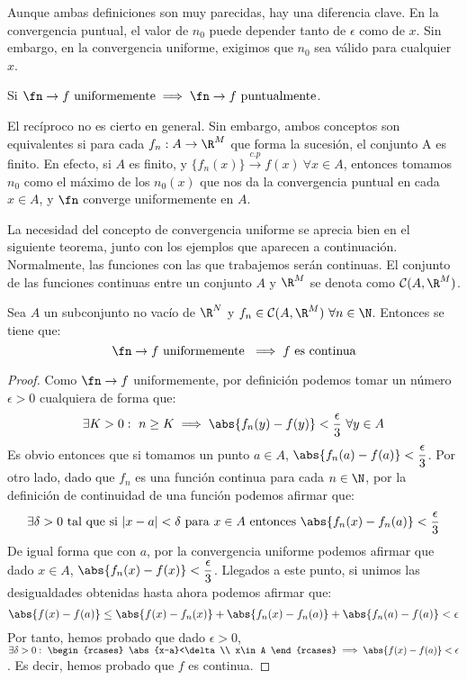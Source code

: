 \begin{nota}
  Aunque ambas definiciones son muy parecidas, hay una diferencia clave. En la convergencia puntual, el valor de $n_0$ puede depender tanto de $\epsilon$ como de $x$. Sin embargo, en la convergencia uniforme, exigimos que $n_0$ sea válido para cualquier $x$.
\end{nota}

\begin{nprop} \label{unif_puntual}
  Si $\fn\to f \text{ uniformemente} \implies \fn \to f \text{ puntualmente}$.
\end{nprop}

  \begin{nota}
    El recíproco no es cierto en general. Sin embargo, ambos conceptos son equivalentes si para cada $f_n : A \rightarrow \R^M$ que forma la sucesión, el conjunto A es finito. En efecto, si $A$ es finito, y $\{f_n(x)\} \xrightarrow {c.p} f(x) \ \forall x \in A$, entonces tomamos $n_0$ como el máximo de los $n_0(x)$ que nos da la convergencia puntual en cada $x \in A$, y $\fn$ converge uniformemente en $A$.
  \end{nota}

  La necesidad del concepto de convergencia uniforme se aprecia bien
  en el siguiente teorema, junto con los ejemplos que aparecen a
  continuación. Normalmente, las funciones con las que trabajemos
  serán continuas. El conjunto de las funciones continuas entre un
  conjunto $A$ y $\R^M$ se denota como $\mathcal{C}(A,\R^M)$.

\begin{nth}
  \label{2}
  Sea $A$ un subconjunto no vacío de $\R^N$ y $f_n \in \mathcal{C}(A,\R^M)\ \forall n\in \N$. Entonces se tiene que:
  \[
    \fn \to f \text{ uniformemente } \implies f \text{ es continua}
  \]
\end{nth}

\begin{proof}
  Como $\fn \to f$ uniformemente, por definición podemos tomar un número $\epsilon > 0$ cualquiera de forma que:
  \[ \exists K>0:\ n\ge K \implies \abs{f_n(y)-f(y)}<\dfrac{\epsilon}{3}\ \forall y\in A \]
    Es obvio entonces que si tomamos un punto $a \in A$, $\abs{f_n(a)-f(a)}<\dfrac{\epsilon}{3}$. Por otro lado, dado que $f_n$ es una función continua para cada $n \in \N$, por la definición de continuidad de una función podemos afirmar que:
    $$\exists \delta > 0 \text{ tal que si } |x-a| < \delta \text{ para } x \in A \text{ entonces } \abs{f_n(x)-f_n(a)} < \dfrac{\epsilon}{3}$$
    De igual forma que con $a$, por la convergencia uniforme podemos afirmar que dado $x \in A$, $\abs{f_n(x)-f(x)}<\dfrac{\epsilon}{3}$.
    Llegados a este punto, si unimos las desigualdades obtenidas hasta ahora podemos afirmar que:
    $$ \abs{f(x)-f(a)} \le \abs{f(x)-f_n(x)} + \abs{f_n(x)-f_n(a)}+\abs{f_n(a)-f(a)} < \epsilon $$
  Por tanto, hemos probado que dado $\epsilon > 0$, \ $\exists \delta>0:\ \begin{rcases}
    \abs{x-a}<\delta\\
    x\in A
  \end{rcases} \implies \abs{f(x)-f(a)}<\epsilon$. Es decir, hemos probado que $f$ es continua.
\end{proof}

